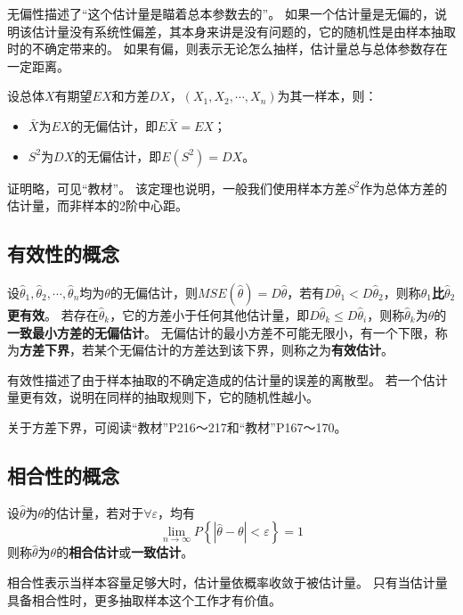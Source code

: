无偏性描述了“这个估计量是瞄着总本参数去的”。
如果一个估计量是无偏的，说明该估计量没有系统性偏差，其本身来讲是没有问题的，它的随机性是由样本抽取时的不确定带来的。
如果有偏，则表示无论怎么抽样，估计量总与总体参数存在一定距离。

\begin{theorem}
设总体$X$有期望$EX$和方差$DX$，$\left( X_1,X_2,\cdots ,X_n \right) $为其一样本，则：
\begin{itemize}
    \item $\bar{X}$为$EX$的无偏估计，即$E\bar{X}=EX$；
    \item $S^2$为$DX$的无偏估计，即$E\left( S^2 \right) =DX$。
\end{itemize}
\end{theorem}

证明略，可见“教材\cite{book1}”。
该定理也说明，一般我们使用样本方差$S^2$作为总体方差的估计量，而非样本的2阶中心距。

\subsection{有效性的概念}

\begin{definition}[有效性]
设$\hat{\theta}_1,\hat{\theta}_2,\cdots ,\hat{\theta}_n$均为$\theta $的无偏估计，则$MSE\left( \hat{\theta} \right) =D\hat{\theta}$，若有$D\hat{\theta}_1<D\hat{\theta}_2$，则称{\bf $\hat{\theta}_1$比$\hat{\theta}_2$更有效}。
若存在$\hat{\theta}_k$，它的方差小于任何其他估计量，即$D\hat{\theta}_k\leqslant D\hat{\theta}_i$，则称$\hat{\theta}_k$为$\theta $的{\bf 一致最小方差的无偏估计}。
无偏估计的最小方差不可能无限小，有一个下限，称为{\bf 方差下界}，若某个无偏估计的方差达到该下界，则称之为{\bf 有效估计}。
\end{definition}

有效性描述了由于样本抽取的不确定造成的估计量的误差的离散型。
若一个估计量更有效，说明在同样的抽取规则下，它的随机性越小。

\begin{tcolorbox}
关于方差下界，可阅读“教材\cite{book1}”P216～217和“教材\cite{book2}”P167～170。
\end{tcolorbox}

\subsection{相合性的概念}

\begin{definition}[相合性]
设$\hat{\theta}$为$\theta $的估计量，若对于$\forall \varepsilon $，均有
\[
\underset{n\rightarrow \infty}{\lim}P\left\{ \left| \hat{\theta}-\theta \right|<\varepsilon \right\} =1
\]
则称$\hat{\theta}$为$\theta $的{\bf 相合估计}或{\bf 一致估计}。
\end{definition}

相合性表示当样本容量足够大时，估计量依概率收敛于被估计量。
只有当估计量具备相合性时，更多抽取样本这个工作才有价值。




